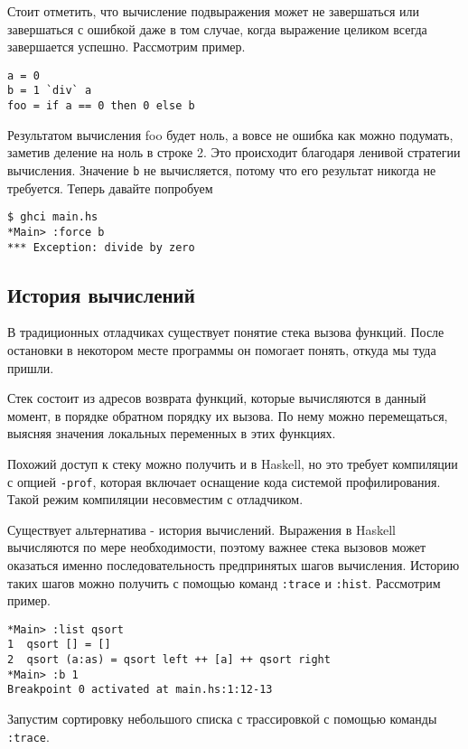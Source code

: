 \documentclass[14pt]{extarticle}
\def\code#1{\texttt{#1}}
\begin{document}
Стоит отметить, что вычисление подвыражения может не завершаться или
завершаться с ошибкой даже в том случае, когда выражение целиком всегда
завершается успешно. Рассмотрим пример.

\begin{lstlisting}[caption=main.hs]
a = 0
b = 1 `div` a
foo = if a == 0 then 0 else b
\end{lstlisting}

Результатом вычисления foo будет ноль, а вовсе не ошибка как можно подумать,
заметив деление на ноль в строке 2. Это происходит благодаря ленивой стратегии
вычисления. Значение \code{b} не вычисляется, потому что его результат
никогда не требуется. Теперь давайте попробуем 

\begin{lstlisting}
$ ghci main.hs
*Main> :force b
*** Exception: divide by zero
\end{lstlisting}

\subsection{История вычислений}

В традиционных отладчиках существует понятие стека вызова функций. После
остановки в некотором месте программы он помогает понять, откуда мы туда
пришли. 

Стек состоит из адресов возврата функций, которые вычисляются в данный момент,
в порядке обратном порядку их вызова. По нему можно перемещаться, выясняя
значения локальных переменных в этих функциях.

Похожий доступ к стеку можно получить и в Haskell, но это требует компиляции с
опцией \code{-prof}, которая включает оснащение кода системой профилирования.
Такой режим компиляции несовместим с отладчиком. 

Существует альтернатива - история вычислений. Выражения в Haskell вычисляются
по мере необходимости, поэтому важнее стека вызовов может оказаться именно
последовательность предпринятых шагов вычисления. Историю таких шагов можно
получить с помощью команд \code{:trace} и \code{:hist}. Рассмотрим пример.

\begin{lstlisting}
*Main> :list qsort
1  qsort [] = []
2  qsort (a:as) = qsort left ++ [a] ++ qsort right
*Main> :b 1
Breakpoint 0 activated at main.hs:1:12-13
\end{lstlisting}

Запустим сортировку небольшого списка с трассировкой с помощью команды \code{:trace}.
\end{document}
